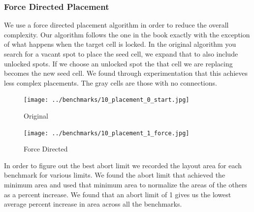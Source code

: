 \documentclass[10pt]{article}
\begin{document}
        \newpage
        \subsubsection{Force Directed Placement}

        We use a force directed placement algorithm in order to reduce the
        overall complexity. Our algorithm follows the one in the book exactly
        with the exception of what happens when the target cell is locked. In
        the original algorithm you search for a vacant spot to place the seed
        cell, we expand that to also include unlocked spots. If we choose an
        unlocked spot the that cell we are replacing becomes the new seed cell.
        We found through experimentation that this achieves less complex
        placements. The gray cells are those with no connections.

        \begin{figure}[H]
            \centering
            \texttt{[image: ../benchmarks/10\_placement\_0\_start.jpg]}
            \caption{Original}
        \end{figure}
        \begin{figure}[H]
            \centering
            \texttt{[image: ../benchmarks/10\_placement\_1\_force.jpg]}
            \caption{Force Directed}
        \end{figure}

        In order to figure out the best abort limit we recorded the layout area
        for each benchmark for various limits. We found the abort limit that
        achieved the minimum area and used that minimum area to normalize the
        areas of the others as a percent increase. We found that an abort limit
        of 1 gives us the lowest average percent increase in area across all
        the benchmarks.
\end{document}

